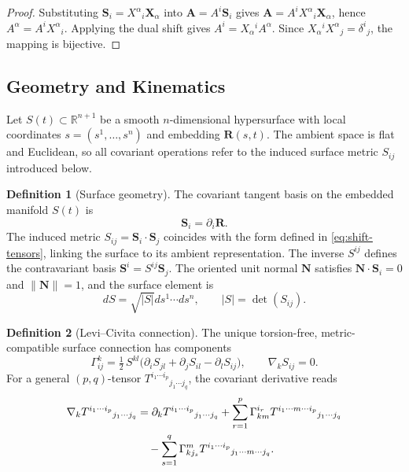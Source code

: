 \documentclass[11pt]{article}
\theoremstyle{definition}
\newtheorem{definition}{Definition}[section]
\theoremstyle{plain}
\theoremstyle{remark}
\begin{document}
\begin{proof}
Substituting $\mathbf{S}_i=X^{\alpha}{}_{i}\mathbf{X}_{\alpha}$ into $\mathbf{A}=A^{i}\mathbf{S}_i$ gives $\mathbf{A}=A^{i}X^{\alpha}{}_{i}\mathbf{X}_{\alpha}$, hence $A^{\alpha}=A^{i}X^{\alpha}{}_{i}$.  
Applying the dual shift gives $A^{i}=X_{\alpha}{}^{i}A^{\alpha}$.  
Since $X_{\alpha}{}^{i}X^{\alpha}{}_{j}=\delta^{i}{}_{j}$, the mapping is bijective.
\end{proof}


\subsection{Geometry and Kinematics}

Let $S(t)\subset\mathbb{R}^{n+1}$ be a smooth $n$-dimensional hypersurface with local coordinates $s=(s^1,\dots,s^n)$ and embedding $\mathbf{R}(s,t)$.  
The ambient space is flat and Euclidean, so all covariant operations refer to the induced surface metric $S_{ij}$ introduced below.

\begin{definition}[Surface geometry]\label{def:surface-geometry}
The covariant tangent basis on the embedded manifold $S(t)$ is
\[
\mathbf{S}_i=\partial_i\mathbf{R}.
\]
The induced metric $S_{ij}=\mathbf{S}_i \cdot \mathbf{S}_j$ coincides with the form defined in \eqref{eq:shift-tensors}, linking the surface to its ambient representation. 
The inverse $S^{ij}$ defines the contravariant basis $\mathbf{S}^{i}=S^{ij}\mathbf{S}_j$.  
The oriented unit normal $\mathbf{N}$ satisfies $\mathbf{N} \cdot \mathbf{S}_i=0$ and $\|\mathbf{N}\|=1$, and the surface element is
\begin{equation}\label{eq:surface-element}
dS=\sqrt{|S|} ds^1 \cdots ds^n, 
\qquad |S|=\det(S_{ij}).
\end{equation}
\end{definition}

\begin{definition}[Levi--Civita connection]\label{def:levi-civita}
The unique torsion-free, metric-compatible surface connection has components
\begin{equation}\label{eq:christoffel}
\Gamma^k_{ij}
=\tfrac12\,S^{kl}\bigl(\partial_i S_{jl}+\partial_j S_{il}-\partial_l S_{ij}\bigr),
\qquad 
\nabla_k S_{ij}=0.
\end{equation}
For a general $(p,q)$-tensor $T^{i_1\cdots i_p}{}_{j_1\cdots j_q}$, the covariant derivative reads
\begin{align}\label{eq:covariant-derivative}
\nabla_k T^{i_1\cdots i_p}{}_{j_1\cdots j_q}
&=\partial_k T^{i_1\cdots i_p}{}_{j_1\cdots j_q}
+\sum_{r=1}^{p}\Gamma^{i_r}_{km} T^{i_1\cdots m\cdots i_p}{}_{j_1\cdots j_q}\notag\\
&\quad-\sum_{s=1}^{q}\Gamma^{m}_{kj_s} T^{i_1\cdots i_p}{}_{j_1\cdots m\cdots j_q}.
\end{align}
\end{definition}
\end{document}
